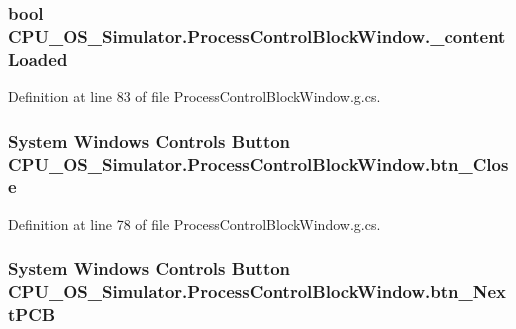 \subsubsection[{\+\_\+content\+Loaded}]{\setlength{\rightskip}{0pt plus 5cm}bool C\+P\+U\+\_\+\+O\+S\+\_\+\+Simulator.\+Process\+Control\+Block\+Window.\+\_\+content\+Loaded\hspace{0.3cm}{\ttfamily [private]}}\label{class_c_p_u___o_s___simulator_1_1_process_control_block_window_aaac6850cf52e098a288515276eee98e0}


Definition at line 83 of file Process\+Control\+Block\+Window.\+g.\+cs.

\hypertarget{class_c_p_u___o_s___simulator_1_1_process_control_block_window_abbfd6b98c1cf8a76437639b1b43859e3}{}
\subsubsection[{btn\+\_\+\+Close}]{\setlength{\rightskip}{0pt plus 5cm}System Windows Controls Button C\+P\+U\+\_\+\+O\+S\+\_\+\+Simulator.\+Process\+Control\+Block\+Window.\+btn\+\_\+\+Close\hspace{0.3cm}{\ttfamily [package]}}\label{class_c_p_u___o_s___simulator_1_1_process_control_block_window_abbfd6b98c1cf8a76437639b1b43859e3}


Definition at line 78 of file Process\+Control\+Block\+Window.\+g.\+cs.

\hypertarget{class_c_p_u___o_s___simulator_1_1_process_control_block_window_a5cdb1a1e4c4351ab1c153309cd15969e}{}
\subsubsection[{btn\+\_\+\+Next\+P\+C\+B}]{\setlength{\rightskip}{0pt plus 5cm}System Windows Controls Button C\+P\+U\+\_\+\+O\+S\+\_\+\+Simulator.\+Process\+Control\+Block\+Window.\+btn\+\_\+\+Next\+P\+C\+B\hspace{0.3cm}{\ttfamily [package]}}\label{class_c_p_u___o_s___simulator_1_1_process_control_block_window_a5cdb1a1e4c4351ab1c153309cd15969e}


